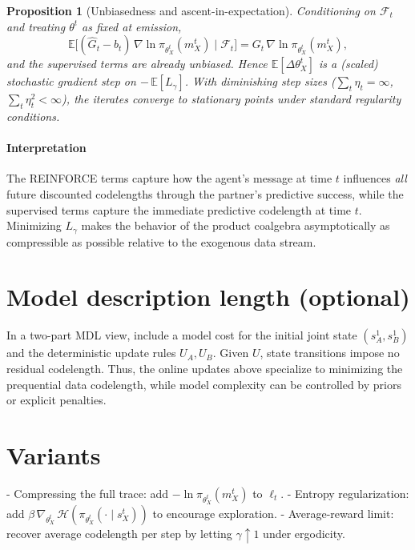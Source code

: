 \documentclass{article}
\newtheorem{proposition}{Proposition}
\begin{document}
\begin{proposition}[Unbiasedness and ascent-in-expectation]
Conditioning on $\mathcal{F}_t$ and treating $\theta^t$ as fixed at emission,
\[
  \mathbb{E}\bigl[(\widehat G_t-b_t)\,\nabla\!\ln\pi_{\theta_X^t}(m_X^t)\mid\mathcal{F}_t\bigr] = G_t\,\nabla\!\ln\pi_{\theta_X^t}(m_X^t),
\]
and the supervised terms are already unbiased. Hence $\mathbb{E}[\Delta\theta_X^t]$ is a (scaled) stochastic gradient step on $-\,\mathbb{E}[L_\gamma]$. With diminishing step sizes ($\sum_t\eta_t=\infty$, $\sum_t\eta_t^2<\infty$), the iterates converge to stationary points under standard regularity conditions.
\end{proposition}

\paragraph{Interpretation} The REINFORCE terms capture how the agent's message at time $t$ influences \emph{all} future discounted codelengths through the partner's predictive success, while the supervised terms capture the immediate predictive codelength at time $t$. Minimizing $L_\gamma$ makes the behavior of the product coalgebra asymptotically as compressible as possible relative to the exogenous data stream.

\section{Model description length (optional)}
In a two-part MDL view, include a model cost for the initial joint state $(s_A^1,s_B^1)$ and the deterministic update rules $U_A,U_B$. Given $U$, state transitions impose no residual codelength. Thus, the online updates above specialize to minimizing the prequential data codelength, while model complexity can be controlled by priors or explicit penalties.

\section{Variants}
- Compressing the full trace: add $-\ln\pi_{\theta_X^t}(m_X^t)$ to $\ell_t$.
- Entropy regularization: add $\beta\,\nabla_{\theta_X^t}\,\mathcal{H}(\pi_{\theta_X^t}(\cdot\mid s_X^t))$ to encourage exploration.
- Average-reward limit: recover average codelength per step by letting $\gamma\uparrow 1$ under ergodicity.
\end{document}
